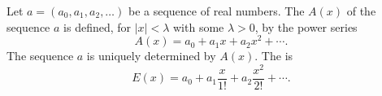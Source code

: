 Let $a = (a_0, a_1, a_2, \ldots)$ be a sequence of real numbers. The  $A(x)$ of the sequence $a$ is defined, for $|x| < \lambda$ with some $\lambda > 0$, by the power series
$$A(x) = a_0 + a_1 x + a_2 x^2 + \cdots.$$
The sequence $a$ is uniquely determined by $A(x)$. The  is
$$E(x) = a_0 + a_1 \frac{x}{1!} + a_2 \frac{x^2}{2!} + \cdots.$$
